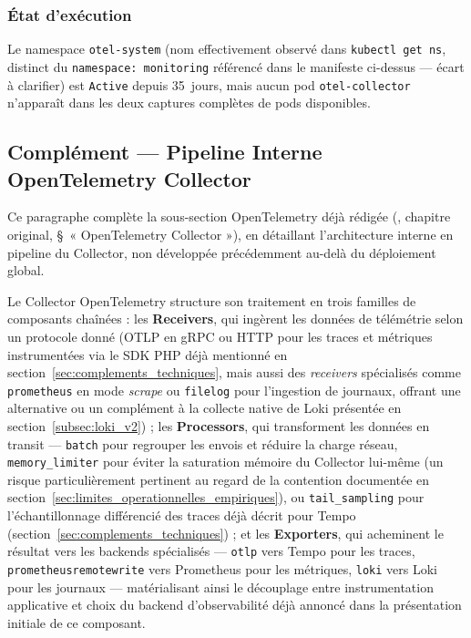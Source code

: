 \subsubsection{État d'exécution}
Le namespace \texttt{otel-system} (nom effectivement observé dans \texttt{kubectl get ns}, distinct du \texttt{namespace: monitoring} référencé dans le manifeste ci-dessus — écart à clarifier) est \texttt{Active} depuis 35~jours, mais aucun pod \texttt{otel-collector} n'apparaît dans les deux captures complètes de pods disponibles.

\subsection*{Complément — Pipeline Interne OpenTelemetry Collector}

Ce paragraphe complète la sous-section OpenTelemetry déjà rédigée (\label{subsec:otel_pipeline_v2_ref}, chapitre original, \S~« OpenTelemetry Collector »), en détaillant l'architecture interne en pipeline du Collector, non développée précédemment au-delà du déploiement global.

Le Collector OpenTelemetry structure son traitement en trois familles de composants chaînées : les \textbf{Receivers}, qui ingèrent les données de télémétrie selon un protocole donné (OTLP en gRPC ou HTTP pour les traces et métriques instrumentées via le SDK PHP déjà mentionné en section~\ref{sec:complements_techniques}, mais aussi des \textit{receivers} spécialisés comme \texttt{prometheus} en mode \textit{scrape} ou \texttt{filelog} pour l'ingestion de journaux, offrant une alternative ou un complément à la collecte native de Loki présentée en section~\ref{subsec:loki_v2}) ; les \textbf{Processors}, qui transforment les données en transit — \texttt{batch} pour regrouper les envois et réduire la charge réseau, \texttt{memory\_limiter} pour éviter la saturation mémoire du Collector lui-même (un risque particulièrement pertinent au regard de la contention documentée en section~\ref{sec:limites_operationnelles_empiriques}), ou \texttt{tail\_sampling} pour l'échantillonnage différencié des traces déjà décrit pour Tempo (section~\ref{sec:complements_techniques}) ; et les \textbf{Exporters}, qui acheminent le résultat vers les backends spécialisés — \texttt{otlp} vers Tempo pour les traces, \texttt{prometheusremotewrite} vers Prometheus pour les métriques, \texttt{loki} vers Loki pour les journaux — matérialisant ainsi le découplage entre instrumentation applicative et choix du backend d'observabilité déjà annoncé dans la présentation initiale de ce composant.

